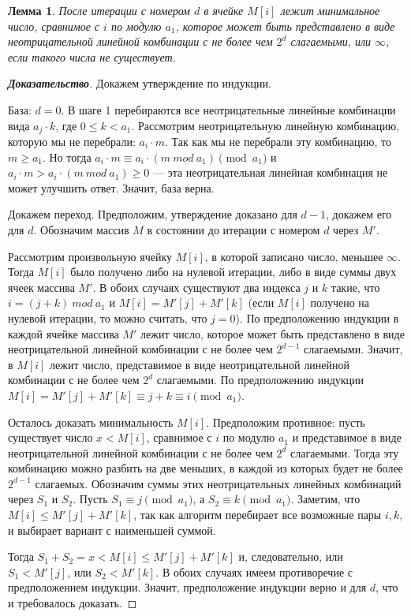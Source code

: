 \documentclass[12pt]{article}
\newtheorem{lemma}[theorem]{Лемма}
\theoremstyle{definition}
\begin{document}
\begin{lemma}
\label{algorithm:lemma2}
После итерации с номером $d$ в ячейке $M[i]$ лежит минимальное число, сравнимое с $i$ по модулю $a_1$, которое может быть представлено в виде неотрицательной линейной комбинации с не более чем $2^d$ слагаемыми, или $\infty$, если такого числа не существует.
\end{lemma}
\begin{proof}[\textbf{Доказательство}]
Докажем утверждение по индукции.

База: $d = 0$. В шаге 1 перебираются все неотрицательные линейные комбинации вида $a_j \cdot k$, где $0 \le k < a_1$. Рассмотрим неотрицательную линейную комбинацию, которую мы не перебрали: $a_i \cdot m$. Так как мы не перебрали эту комбинацию, то $m \ge a_1$. Но тогда $a_i \cdot m \equiv a_i \cdot (m \ mod \ a_1) \pmod {a_1}$ и $a_i \cdot m > a_i \cdot (m \ mod \ a_1) \ge 0$ --- эта неотрицательная линейная комбинация не может улучшить ответ. Значит, база верна.

Докажем переход. Предположим, утверждение доказано для $d - 1$, докажем его для $d$. Обозначим массив $M$ в состоянии до итерации с номером $d$ через $M'$.

Рассмотрим произвольную ячейку $M[i]$, в которой записано число, меньшее $\infty$. Тогда $M[i]$ было получено либо на нулевой итерации, либо в виде суммы двух ячеек массива $M'$. В обоих случаях существуют два индекса $j$ и $k$ такие, что $i = (j + k) \ mod \ a_1$ и $M[i] = M'[j] + M'[k]$ (если $M[i]$ получено на нулевой итерации, то можно считать, что $j = 0$). По предположению индукции в каждой ячейке массива $M'$ лежит число, которое может быть представлено в виде неотрицательной линейной комбинации с не более чем $2^{d - 1}$ слагаемыми. Значит, в $M[i]$ лежит число, представимое в виде неотрицательной линейной комбинации с не более чем $2^d$ слагаемыми. По предположению индукции $M[i] = M'[j] + M'[k] \equiv j + k \equiv i \pmod{a_1}$.

Осталось доказать минимальность $M[i]$. Предположим противное: пусть существует число $x < M[i]$, сравнимое с $i$ по модулю $a_1$ и представимое в виде неотрицательной линейной комбинации с не более чем $2^d$ слагаемыми. Тогда эту комбинацию можно разбить на две меньших, в каждой из которых будет не более $2^{d - 1}$ слагаемых. Обозначим суммы этих неотрицательных линейных комбинаций через $S_1$ и $S_2$. Пусть $S_1 \equiv j \pmod{a_1}$, а $S_2 \equiv k \pmod{a_1}$. Заметим, что $M[i] \le M'[j] + M'[k]$, так как алгоритм перебирает все возможные пары $i, k$, и выбирает вариант с наименьшей суммой.

Тогда $S_1 + S_2 = x < M[i] \le M'[j] + M'[k]$ и, следовательно, или $S_1 < M'[j]$, или $S_2 < M'[k]$. В обоих случаях имеем противоречие с предположением индукции. Значит, предположение индукции верно и для $d$, что и требовалось доказать.
\end{proof}
\end{document}
